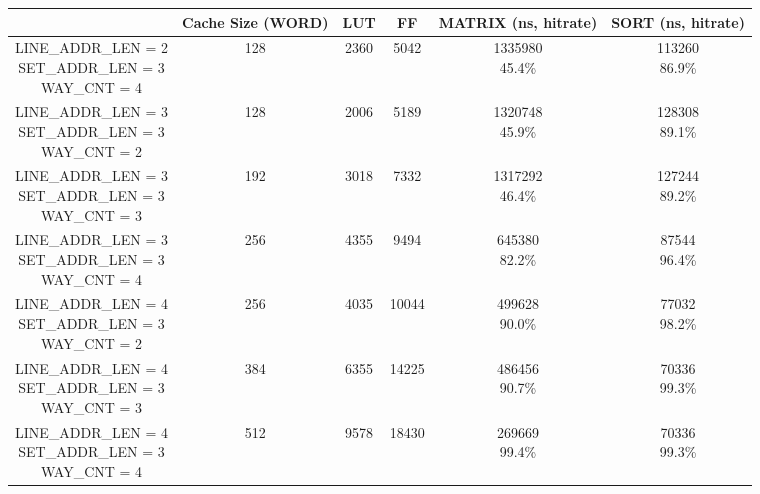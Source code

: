 \documentclass{article}
\begin{document}
\begin{table}[H]
  \centering
  \begin{tabular}{c c c c c c}
    \toprule
     & Cache Size (WORD) & LUT & FF & MATRIX (ns, hitrate) & SORT (ns, hitrate)\\
    \midrule
    \makecell{LINE\_ADDR\_LEN = 2 \\ SET\_ADDR\_LEN = 3 \\ WAY\_CNT = 4} & 128 & 2360 & 5042 & \makecell{1335980 \\ 45.4\%} & \makecell{113260\\ 86.9\%} \\
    \midrule
    \makecell{LINE\_ADDR\_LEN = 3 \\ SET\_ADDR\_LEN = 3 \\ WAY\_CNT = 2} & 128 & 2006 & 5189 & \makecell{1320748 \\ 45.9\%} & \makecell{128308\\ 89.1\%} \\
    \midrule
    \makecell{LINE\_ADDR\_LEN = 3 \\ SET\_ADDR\_LEN = 3 \\ WAY\_CNT = 3} & 192 & 3018 & 7332 & \makecell{1317292  \\ 46.4\%} & \makecell{127244\\ 89.2\%}\\
    \midrule
    \makecell{LINE\_ADDR\_LEN = 3 \\ SET\_ADDR\_LEN = 3 \\ WAY\_CNT = 4} & 256 & 4355 & 9494 & \makecell{645380 \\ 82.2\%} & \makecell{87544\\ 96.4\%} \\
    \midrule
    \makecell{LINE\_ADDR\_LEN = 4 \\ SET\_ADDR\_LEN = 3 \\ WAY\_CNT = 2} & 256 & 4035 & 10044 & \makecell{499628 \\ 90.0\%} & \makecell{77032\\ 98.2\%} \\
    \midrule
    \makecell{LINE\_ADDR\_LEN = 4 \\ SET\_ADDR\_LEN = 3 \\ WAY\_CNT = 3} & 384 & 6355 & 14225 & \makecell{486456 \\ 90.7\%} & \makecell{70336\\ 99.3\%} \\
    \midrule
    \makecell{LINE\_ADDR\_LEN = 4 \\ SET\_ADDR\_LEN = 3 \\ WAY\_CNT = 4} & 512 & 9578 & 18430 & \makecell{269669 \\ 99.4\%} & \makecell{70336\\ 99.3\%} \\

\end{tabular}
\end{table}
\end{document}
